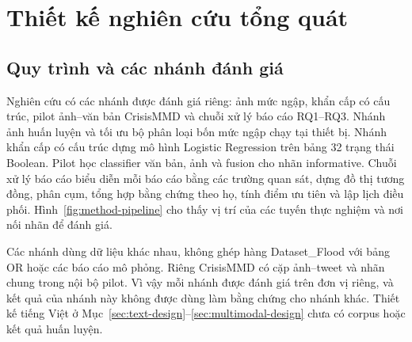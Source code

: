 \section{Thiết kế nghiên cứu tổng quát}\label{sec:02-overview}
\subsection{Quy trình và các nhánh đánh giá}
Nghiên cứu có các nhánh được đánh giá riêng: ảnh mức ngập, khẩn cấp có cấu trúc, pilot ảnh--văn bản CrisisMMD và chuỗi xử lý báo cáo RQ1--RQ3. Nhánh ảnh huấn luyện và tối ưu bộ phân loại bốn mức ngập chạy tại thiết bị. Nhánh khẩn cấp có cấu trúc dựng mô hình Logistic Regression trên bảng 32 trạng thái Boolean. Pilot học classifier văn bản, ảnh và fusion cho nhãn informative. Chuỗi xử lý báo cáo biểu diễn mỗi báo cáo bằng các trường quan sát, dựng đồ thị tương đồng, phân cụm, tổng hợp bằng chứng theo họ, tính điểm ưu tiên và lập lịch điều phối. Hình~\ref{fig:method-pipeline} cho thấy vị trí của các tuyến thực nghiệm và nơi nối nhãn để đánh giá.

Các nhánh dùng dữ liệu khác nhau, không ghép hàng Dataset\_Flood với bảng OR hoặc các báo cáo mô phỏng. Riêng CrisisMMD có cặp ảnh--tweet và nhãn chung trong nội bộ pilot. Vì vậy mỗi nhánh được đánh giá trên đơn vị riêng, và kết quả của nhánh này không được dùng làm bằng chứng cho nhánh khác. Thiết kế tiếng Việt ở Mục~\ref{sec:text-design}--\ref{sec:multimodal-design} chưa có corpus hoặc kết quả huấn luyện.

